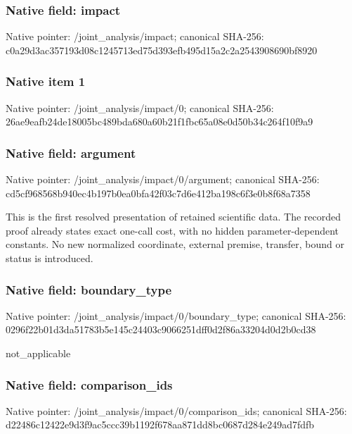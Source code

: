 \documentclass[10pt,a4paper]{article}
\begin{document}
\subsubsection{Native field: impact}
Native pointer: /joint\_\allowbreak{}analysis/impact; canonical SHA-256: c0a29d3ac357193d08c1245713ed75d393efb495d15a2c2a2543908690bf8920

\subsubsection{Native item 1}
Native pointer: /joint\_\allowbreak{}analysis/impact/0; canonical SHA-256: 26ae9eafb24de18005bc489bda680a60b21f1fbc65a08e0d50b34c264f10f9a9

\subsubsection{Native field: argument}
Native pointer: /joint\_\allowbreak{}analysis/impact/0/argument; canonical SHA-256: cd5cf968568b940ec4b197b0ea0bfa42f03c7d6e412ba198c6f3e0b8f68a7358

\begingroup\raggedright\sloppy This is the first resolved presentation of retained scientific data. The recorded proof already states exact one-call cost,\allowbreak{} with no hidden parameter-dependent constants. No new normalized coordinate,\allowbreak{} external premise,\allowbreak{} transfer,\allowbreak{} bound or status is introduced.\par\endgroup

\subsubsection{Native field: boundary\_\allowbreak{}type}
Native pointer: /joint\_\allowbreak{}analysis/impact/0/boundary\_\allowbreak{}type; canonical SHA-256: 0296f22b01d3da51783b5e145c24403c9066251dff0d2f86a33204d0d2b0cd38

\begingroup\raggedright\sloppy not\_\allowbreak{}applicable\par\endgroup

\subsubsection{Native field: comparison\_\allowbreak{}ids}
Native pointer: /joint\_\allowbreak{}analysis/impact/0/comparison\_\allowbreak{}ids; canonical SHA-256: d22486c12422e9d3f9ac5ccc39b1192f678aa871dd8bc0687d284e249ad7fdfb
\end{document}
